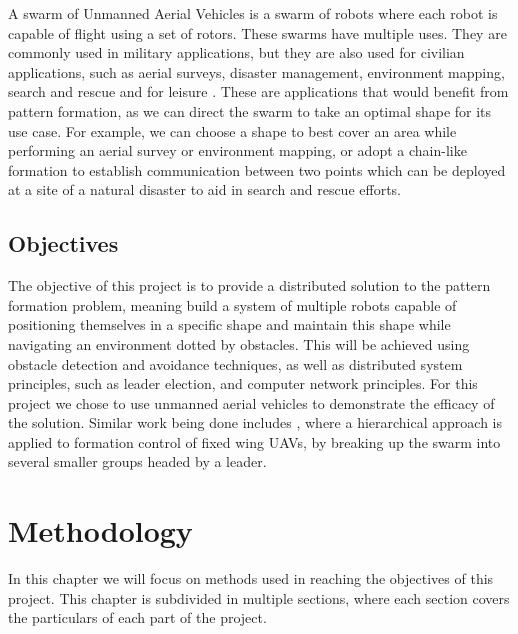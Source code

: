 A swarm of Unmanned Aerial Vehicles is a swarm of robots where each robot is capable of flight using
a set of rotors. These swarms have multiple uses. They are commonly used in military applications, but
they are also used for civilian applications, such as aerial surveys, disaster management, environment
mapping, search and rescue and for leisure \autocite{TA19}. These are applications that would benefit
from pattern formation, as we can direct the swarm to take an optimal shape for its use case. For 
example, we can choose a shape to best cover an area while performing an aerial survey or environment
mapping, or adopt a chain-like formation to establish communication between two points \autocite{MS20}
which can be deployed at a site of a natural disaster to aid in search and rescue efforts.


\section{Objectives}

The objective of this project is to provide a distributed solution to the pattern formation problem, meaning
build a system of multiple robots capable of positioning themselves in a specific shape and maintain this
shape while navigating an environment dotted by obstacles. This will be achieved using obstacle detection
and avoidance techniques, as well as distributed system principles, such as leader election, and computer
network principles. For this project we chose to use unmanned aerial vehicles to demonstrate the efficacy
of the solution. Similar work being done includes \autocite{HC21}, where a hierarchical approach is applied
to formation control of fixed wing UAVs, by breaking up the swarm into several smaller groups headed by a 
leader.


\chapter{Methodology}

In this chapter we will focus on methods used in reaching the objectives of this project. This chapter
is subdivided in multiple sections, where each section covers the particulars of each part of the 
project.

\section{}




\printbibliography

